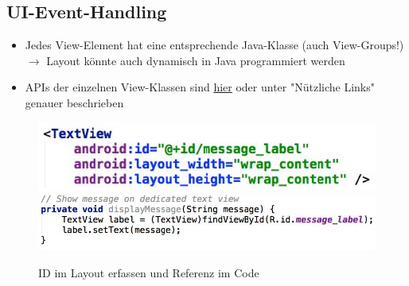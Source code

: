 \documentclass[a4paper]{article}
\begin{document}
\newpage
\subsection{UI-Event-Handling}
\begin{itemize}
	\item Jedes View-Element hat eine entsprechende Java-Klasse (auch View-Groups!) \\$\rightarrow$ Layout könnte auch dynamisch in Java programmiert werden
	\item APIs der einzelnen View-Klassen sind \href{http://developer.android.com/reference/android/widget/package-summary.html}{hier} oder unter "Nützliche Links" genauer beschrieben
\end{itemize}
\begin{figure}[htb!]
	\centering
	\includegraphics[width=0.5\linewidth]{img/layout_id.jpg}
	\includegraphics[width=0.5\linewidth]{img/reference_code.jpg}
	\caption{ID im Layout erfassen und Referenz im Code}
\end{figure}
\end{document}
